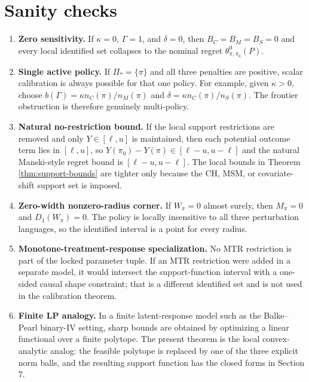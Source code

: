 \documentclass[11pt]{article}
\theoremstyle{definition}
\theoremstyle{plain}
\theoremstyle{remark}
\begin{document}
\section{Sanity checks}
\begin{enumerate}[leftmargin=*]
\item \textbf{Zero sensitivity.}  If $\kappa=0$, $\Gamma=1$, and $\delta=0$, then
$B_C=B_M=B_S=0$ and every local identified set collapses to the nominal regret
$\theta^0_{\pi,\pi_0}(P)$.

\item \textbf{Single active policy.}  If $\Pi_\ast=\{\pi\}$ and all three penalties
are positive, scalar calibration is always possible for that one policy.  For example,
given $\kappa>0$, choose $b(\Gamma)=\kappa n_C(\pi)/n_M(\pi)$ and
$\delta=\kappa n_C(\pi)/n_S(\pi)$.  The frontier obstruction is therefore genuinely
multi-policy.

\item \textbf{Natural no-restriction bound.}  If the local support restrictions are
removed and only $Y\in[\ell,u]$ is maintained, then each potential outcome term lies
in $[\ell,u]$, so
$Y(\pi_0)-Y(\pi)\in[\ell-u,u-\ell]$ and the natural Manski-style regret bound is
$[\ell-u,u-\ell]$.  The local bounds in Theorem \ref{thm:support-bounds} are tighter
only because the CH, MSM, or covariate-shift support set is imposed.

\item \textbf{Zero-width nonzero-radius corner.}  If $W_\pi=0$ almost surely, then
$M_\pi=0$ and $D_1(W_\pi)=0$.  The policy is locally insensitive to all three
perturbation languages, so the identified interval is a point for every radius.

\item \textbf{Monotone-treatment-response specialization.}  No MTR restriction is
part of the locked parameter tuple.  If an MTR restriction were added in a separate
model, it would intersect the support-function interval with a one-sided causal
shape constraint; that is a different identified set and is not used in the
calibration theorem.

\item \textbf{Finite LP analogy.}  In a finite latent-response model such as the
Balke--Pearl binary-IV setting, sharp bounds are obtained by optimizing a linear
functional over a finite polytope.  The present theorem is the local convex-analytic
analog: the feasible polytope is replaced by one of the three explicit norm balls,
and the resulting support function has the closed forms in Section 7.
\end{enumerate}
\end{document}
